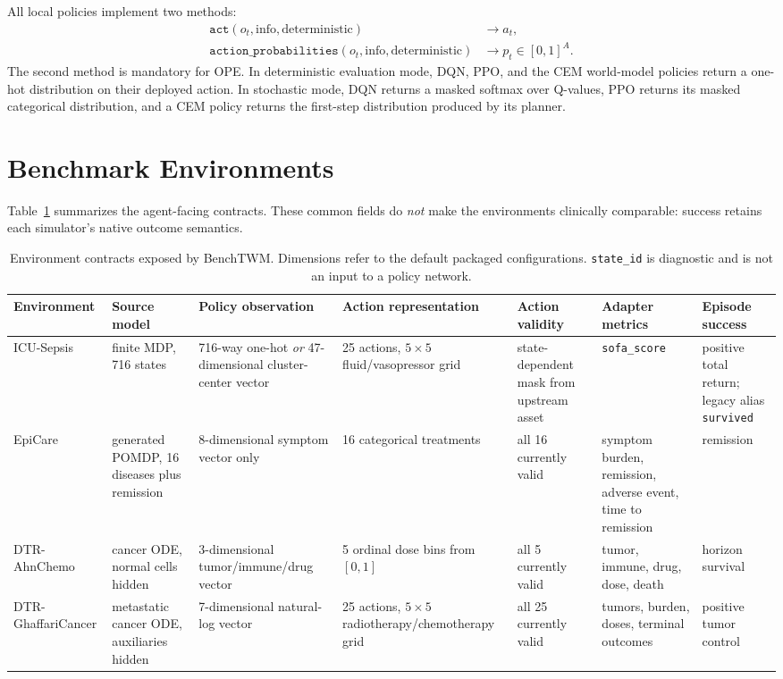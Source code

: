 \documentclass[10pt,twocolumn]{article}
\newcommand{\code}[1]{\texttt{#1}}
\begin{document}
All local policies implement two methods:
\begin{align}
    \code{act}(o_t,\mathrm{info},\mathrm{deterministic}) &\rightarrow a_t, \\
    \code{action\_probabilities}(o_t,\mathrm{info},\mathrm{deterministic}) &\rightarrow p_t \in [0,1]^A.
\end{align}
The second method is mandatory for OPE. In deterministic evaluation mode, DQN, PPO, and the CEM world-model policies return a one-hot distribution on their deployed action. In stochastic mode, DQN returns a masked softmax over Q-values, PPO returns its masked categorical distribution, and a CEM policy returns the first-step distribution produced by its planner.

\section{Benchmark Environments}
\label{sec:environments}

Table~\ref{tab:environments} summarizes the agent-facing contracts. These common fields do \emph{not} make the environments clinically comparable: success retains each simulator's native outcome semantics.

\begin{table}[t]
\centering
\caption{Environment contracts exposed by BenchTWM. Dimensions refer to the default packaged configurations. \code{state\_id} is diagnostic and is not an input to a policy network.}
\label{tab:environments}
\small
\begin{tabularx}{\textwidth}{lXXXXXX}
\toprule
Environment & Source model & Policy observation & Action representation & Action validity & Adapter metrics & Episode success \\
\midrule
ICU-Sepsis & finite MDP, 716 states & 716-way one-hot \emph{or} 47-dimensional cluster-center vector & 25 actions, $5 \times 5$ fluid/vasopressor grid & state-dependent mask from upstream asset & \code{sofa\_score} & positive total return; legacy alias \code{survived} \\
EpiCare & generated POMDP, 16 diseases plus remission & 8-dimensional symptom vector only & 16 categorical treatments & all 16 currently valid & symptom burden, remission, adverse event, time to remission & remission \\
DTR-AhnChemo & cancer ODE, normal cells hidden & 3-dimensional tumor/immune/drug vector & 5 ordinal dose bins from $[0,1]$ & all 5 currently valid & tumor, immune, drug, dose, death & horizon survival \\
DTR-GhaffariCancer & metastatic cancer ODE, auxiliaries hidden & 7-dimensional natural-log vector & 25 actions, $5 \times 5$ radiotherapy/chemotherapy grid & all 25 currently valid & tumors, burden, doses, terminal outcomes & positive tumor control \\
\bottomrule
\end{tabularx}
\end{table}
\end{document}
